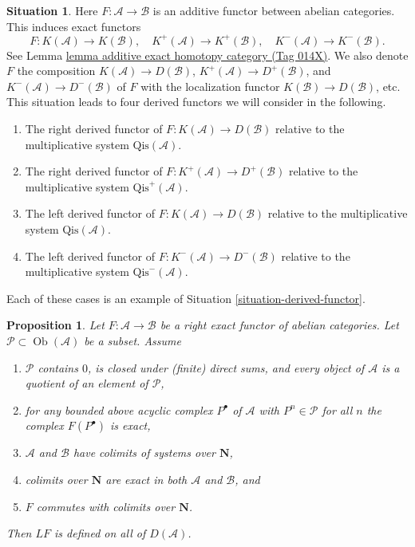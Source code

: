 \documentclass{amsart}
\theoremstyle{plain}
\newtheorem{proposition}[subsection]{Proposition}
\theoremstyle{definition}
\newtheorem{situation}[subsection]{Situation}
\theoremstyle{remark}
\numberwithin{equation}{subsection}
\def\Ob{\mathop{\mathrm{Ob}}\nolimits}
\begin{document}
\begin{situation}
\label{situation-classical}
Here $F : \mathcal{A} \to \mathcal{B}$ is an additive functor between
abelian categories. This induces exact functors
$$
F : K(\mathcal{A}) \to K(\mathcal{B}), \quad
K^{+}(\mathcal{A}) \to K^{+}(\mathcal{B}), \quad
K^{-}(\mathcal{A}) \to K^{-}(\mathcal{B}).
$$
See Lemma \href{https://stacks.math.columbia.edu/tag/014X}{lemma additive exact homotopy category (Tag 014X)}.
We also denote $F$ the composition $K(\mathcal{A}) \to D(\mathcal{B})$,
$K^{+}(\mathcal{A}) \to D^{+}(\mathcal{B})$, and
$K^{-}(\mathcal{A}) \to D^-(\mathcal{B})$ of $F$ with the localization
functor $K(\mathcal{B}) \to D(\mathcal{B})$, etc. This situation leads
to four derived functors we will consider in the following.
\begin{enumerate}
\item The right derived functor of
$F : K(\mathcal{A}) \to D(\mathcal{B})$
relative to the multiplicative system $\text{Qis}(\mathcal{A})$.
\item The right derived functor of
$F : K^{+}(\mathcal{A}) \to D^{+}(\mathcal{B})$
relative to the multiplicative system $\text{Qis}^{+}(\mathcal{A})$.
\item The left derived functor of
$F : K(\mathcal{A}) \to D(\mathcal{B})$
relative to the multiplicative system $\text{Qis}(\mathcal{A})$.
\item The left derived functor of
$F : K^{-}(\mathcal{A}) \to D^{-}(\mathcal{B})$
relative to the multiplicative system $\text{Qis}^-(\mathcal{A})$.
\end{enumerate}
Each of these cases is an example of
Situation \ref{situation-derived-functor}.
\end{situation}

\begin{proposition}
\label{proposition-left-derived-exists}
Let $F : \mathcal{A} \to \mathcal{B}$ be a right exact functor
of abelian categories. Let $\mathcal{P} \subset \Ob(\mathcal{A})$ be a
subset. Assume
\begin{enumerate}
\item $\mathcal{P}$ contains $0$, is closed under (finite) direct sums,
and every object of $\mathcal{A}$ is a quotient of an
element of $\mathcal{P}$,
\item for any bounded above acyclic complex $P^\bullet$ of
$\mathcal{A}$ with $P^n \in \mathcal{P}$ for all $n$ the
complex $F(P^\bullet)$ is exact,
\item $\mathcal{A}$ and $\mathcal{B}$ have colimits
of systems over $\mathbf{N}$,
\item colimits over $\mathbf{N}$ are exact in both
$\mathcal{A}$ and $\mathcal{B}$, and
\item $F$ commutes with colimits over $\mathbf{N}$.
\end{enumerate}
Then $LF$ is defined on all of $D(\mathcal{A})$.
\end{proposition}
\end{document}
